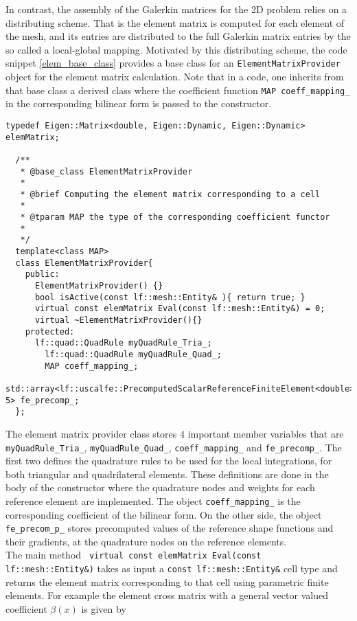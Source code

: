 In contrast, the assembly of the Galerkin matrices for the 2D problem relies on a distributing scheme. That is the element matrix is computed for each element of the mesh, and its entries are distributed to the full Galerkin matrix entries by the so called a local-global mapping. Motivated by this distributing scheme, 
the code snippet \eqref{elem_base_class} provides a base class for an \lstinline{ElementMatrixProvider} object for the element matrix calculation. Note that in a code, one inherits from that base class a derived class where the coefficient function \lstinline{MAP coeff_mapping_} in the corresponding bilinear form is passed to the constructor.
\begin{lstlisting}[caption={Element matrix provider base class.}, label={elem_base_class}] 
  typedef Eigen::Matrix<double, Eigen::Dynamic, Eigen::Dynamic> elemMatrix; 
  
  /** 
   * @base_class ElementMatrixProvider
   *
   * @brief Computing the element matrix corresponding to a cell 
   *
   * @tparam MAP the type of the corresponding coefficient functor
   *
   */
  template<class MAP> 
  class ElementMatrixProvider{ 
    public: 
      ElementMatrixProvider() {}
      bool isActive(const lf::mesh::Entity& ){ return true; }
      virtual const elemMatrix Eval(const lf::mesh::Entity&) = 0; 
      virtual ~ElementMatrixProvider(){}
    protected:
      lf::quad::QuadRule myQuadRule_Tria_;
	    lf::quad::QuadRule myQuadRule_Quad_;
	    MAP coeff_mapping_; 
      std::array<lf::uscalfe::PrecomputedScalarReferenceFiniteElement<double>, 5> fe_precomp_; 
  };
\end{lstlisting}
The element matrix provider class stores 4 important member variables that are \lstinline{myQuadRule_Tria_}, \lstinline{myQuadRule_Quad_}, \lstinline{coeff_mapping_} and \lstinline{fe_precomp_}. The first two defines the quadrature rules to be used for the local integrations, for both triangular and quadrilateral elements. These definitions are done in the body of the constructor where the quadrature nodes and weights for each reference element are implemented. The object \lstinline{coeff_mapping_} is the corresponding coefficient of the bilinear form. On the other side, the object \lstinline{fe_precom_p_} stores precomputed values of the reference shape functions and their gradients, at the quadrature nodes on the reference elements. \\
The main method \lstinline{ virtual const elemMatrix Eval(const lf::mesh::Entity&)} takes as input a \lstinline{const lf::mesh::Entity&} cell type and returns the element matrix corresponding to that cell using parametric finite elements. For example the element cross matrix with a general vector valued coefficient $\beta(x)$ is given by
